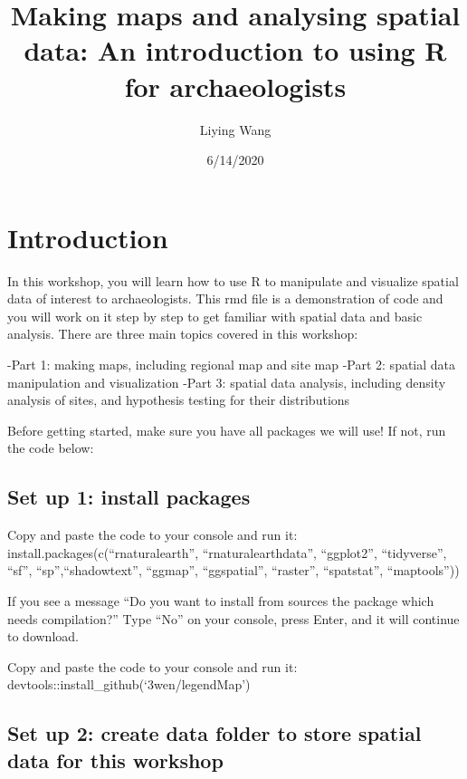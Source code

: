 \documentclass[
  xelatex,ja=standard]{bxjsarticle}
\title{Making maps and analysing spatial data: An introduction to using R for
archaeologists}
\author{Liying Wang}
\date{6/14/2020}
\begin{document}
\maketitle

\hypertarget{introduction}{%
\section{Introduction}\label{introduction}}

In this workshop, you will learn how to use R to manipulate and
visualize spatial data of interest to archaeologists. This rmd file is a
demonstration of code and you will work on it step by step to get
familiar with spatial data and basic analysis. There are three main
topics covered in this workshop:

-Part 1: making maps, including regional map and site map -Part 2:
spatial data manipulation and visualization -Part 3: spatial data
analysis, including density analysis of sites, and hypothesis testing
for their distributions

Before getting started, make sure you have all packages we will use! If
not, run the code below:

\hypertarget{set-up-1-install-packages}{%
\subsection{Set up 1: install
packages}\label{set-up-1-install-packages}}

Copy and paste the code to your console and run it:
install.packages(c(``rnaturalearth'', ``rnaturalearthdata'',
``ggplot2'', ``tidyverse'', ``sf'', ``sp'',``shadowtext'', ``ggmap'',
``ggspatial'', ``raster'', ``spatstat'', ``maptools''))

If you see a message ``Do you want to install from sources the package
which needs compilation?'' Type ``No'' on your console, press Enter, and
it will continue to download.

Copy and paste the code to your console and run it:
devtools::install\_github(`3wen/legendMap')

\hypertarget{set-up-2-create-data-folder-to-store-spatial-data-for-this-workshop}{%
\subsection{Set up 2: create data folder to store spatial data for this
workshop}\label{set-up-2-create-data-folder-to-store-spatial-data-for-this-workshop}}
\end{document}
